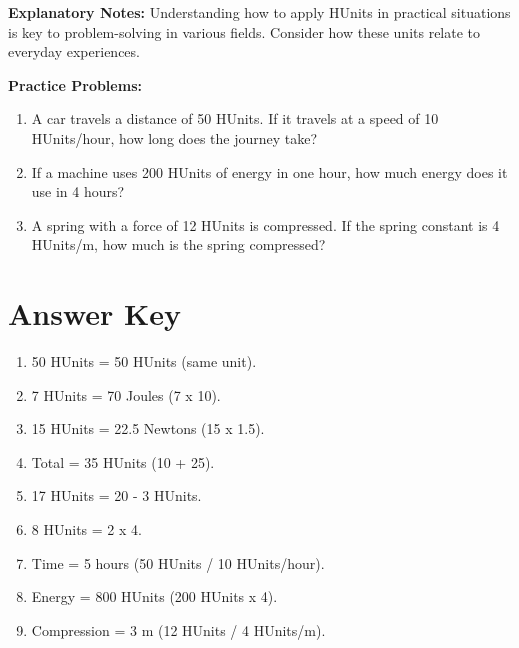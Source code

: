 \documentclass{article}
\begin{document}
\textbf{Explanatory Notes:}
Understanding how to apply HUnits in practical situations is key to problem-solving in various fields. Consider how these units relate to everyday experiences.

\textbf{Practice Problems:}
\begin{enumerate}
    \item A car travels a distance of 50 HUnits. If it travels at a speed of 10 HUnits/hour, how long does the journey take?
    \item If a machine uses 200 HUnits of energy in one hour, how much energy does it use in 4 hours?
    \item A spring with a force of 12 HUnits is compressed. If the spring constant is 4 HUnits/m, how much is the spring compressed?
\end{enumerate}

\section*{Answer Key}
\begin{enumerate}
    \item 50 HUnits = 50 HUnits (same unit).
    \item 7 HUnits = 70 Joules (7 x 10).
    \item 15 HUnits = 22.5 Newtons (15 x 1.5).
    \item Total = 35 HUnits (10 + 25).
    \item 17 HUnits = 20 - 3 HUnits.
    \item 8 HUnits = 2 x 4.
    \item Time = 5 hours (50 HUnits / 10 HUnits/hour).
    \item Energy = 800 HUnits (200 HUnits x 4).
    \item Compression = 3 m (12 HUnits / 4 HUnits/m).
\end{enumerate}
\end{document}
